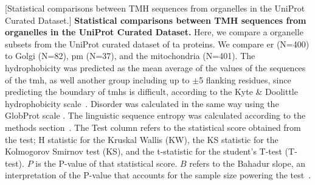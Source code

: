 \begin{table}[htbp]
\centering
{}[Statistical comparisons between TMH sequences from organelles in the UniProt Curated Dataset.]
{\textbf{Statistical comparisons between TMH sequences from organelles in the UniProt Curated Dataset.}
Here, we compare a organelle subsets from the UniProt curated dataset of \gls{ta} proteins.
We compare \gls{er} (N=400) to Golgi (N=82), \gls{pm} (N=37), and the mitochondria (N=401).
The hydrophobicity was predicted as the mean average of the values of the sequences of the \gls{tmh}, as well another group including up to $\pm$5 flanking residues, since predicting the boundary of \gls{tmh}s is difficult, according to the Kyte \& Doolittle hydrophobicity scale~\cite{Kyte1982}.
Disorder was calculated in the same way using the GlobProt scale \cite{Linding2003}.
The linguistic sequence entropy was calculated according to the methods section~\cite{Shannon1948}.
The Test column refers to the statistical score obtained from the test; H statistic for the Kruskal Wallis (KW), the KS statistic for the Kolmogorov Smirnov test (KS), and the t-statistic for the student's T-test (T-test).
$P$ is the P-value of that statistical score.
$B$ refers to the Bahadur slope, an interpretation of the P-value that accounts for the sample size powering the test~\cite{Bahadur1967, Bahadur1971}.}
	\tiny


\end{table}
